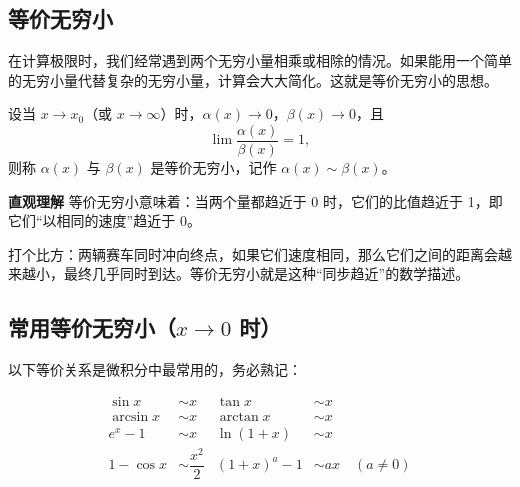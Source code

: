 \documentclass{ctexart}
\newenvironment{custom}[1]{\par\noindent \textbf{#1}\quad}{\par\vspace{1em}}
\begin{document}
\subsection{等价无穷小}

在计算极限时，我们经常遇到两个无穷小量相乘或相除的情况。如果能用一个简单的无穷小量代替复杂的无穷小量，计算会大大简化。这就是等价无穷小的思想。

\begin{definition}[等价无穷小]
设当 \(x \to x_0\)（或 \(x \to \infty\)）时，\(\alpha(x) \to 0\)，\(\beta(x) \to 0\)，且
\[
\lim \dfrac{\alpha(x)}{\beta(x)} = 1,
\]
则称 \(\alpha(x)\) 与 \(\beta(x)\) 是等价无穷小，记作 \(\alpha(x) \sim \beta(x)\)。
\end{definition}

\begin{custom}{直观理解}
等价无穷小意味着：当两个量都趋近于 0 时，它们的比值趋近于 1，即它们“以相同的速度”趋近于 0。

打个比方：两辆赛车同时冲向终点，如果它们速度相同，那么它们之间的距离会越来越小，最终几乎同时到达。等价无穷小就是这种“同步趋近”的数学描述。
\end{custom}

\subsection{常用等价无穷小（\(x \to 0\) 时）}

以下等价关系是微积分中最常用的，务必熟记：

\[
\boxed{
\begin{aligned}
\sin x &\sim x & \tan x &\sim x \\
\arcsin x &\sim x & \arctan x &\sim x \\
e^x - 1 &\sim x & \ln(1+x) &\sim x \\
1 - \cos x &\sim \dfrac{x^2}{2} & (1+x)^a - 1 &\sim ax \quad (a \neq 0)
\end{aligned}
}
\]
\end{document}
